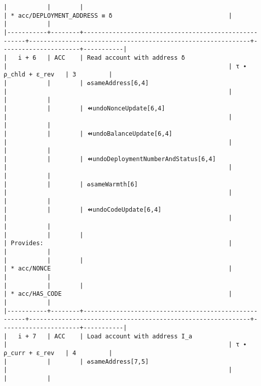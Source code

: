 \documentclass[varwidth=\maxdimen,margin=0.5cm,multi={verbatim}]{standalone}
\begin{document}
\begin{verbatim}
|           |        |                                                      | * acc/DEPLOYMENT_ADDRESS ≡ δ                                |                      |           |
|-----------+--------+------------------------------------------------------+-------------------------------------------------------------+----------------------+-----------|
|   i + 6   | ACC    | Read account with address δ                          |                                                             | τ ∙ ρ_chld + ε_rev   | 3         |
|           |        | ♻️sameAddress[6,4]                                   |                                                             |                      |           |
|           |        | ⏪undoNonceUpdate[6,4]                               |                                                             |                      |           |
|           |        | ⏪undoBalanceUpdate[6,4]                             |                                                             |                      |           |
|           |        | ⏪undoDeploymentNumberAndStatus[6,4]                 |                                                             |                      |           |
|           |        | ♻️sameWarmth[6]                                      |                                                             |                      |           |
|           |        | ⏪undoCodeUpdate[6,4]                                |                                                             |                      |           |
|           |        |                                                      | Provides:                                                   |                      |           |
|           |        |                                                      | * acc/NONCE                                                 |                      |           |
|           |        |                                                      | * acc/HAS_CODE                                              |                      |           |
|-----------+--------+------------------------------------------------------+-------------------------------------------------------------+----------------------+-----------|
|   i + 7   | ACC    | Load account with address I_a                        |                                                             | τ ∙ ρ_curr + ε_rev   | 4         |
|           |        | ♻️sameAddress[7,5]                                   |                                                             |                      |           |

\end{verbatim}
\end{document}
